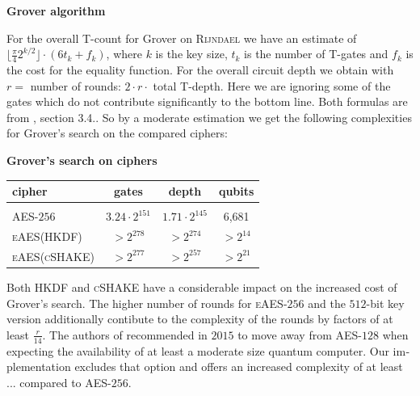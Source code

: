 \documentclass[a4paper,11pt]{article}
\begin{document}
\begin{otherlanguage}{english}
\begin{multicols}{2}
\begin{center}
\textbf{Grover algorithm} \\
\end{center}

\noindent
For the overall T-count for Grover on \textsc{Rijndael} we have an estimate of $\lfloor \frac{\pi}{4} 2^{k/2}\rfloor \cdot (6 t_{k} + f_k)$, where $k$ is the key size, $t_k$ is the number of T-gates and $f_k$ is the cost for the equality function. For the overall circuit depth we obtain with $r=$ number of rounds: $2 \cdot r \cdot$ total T-depth. Here we are ignoring some of the gates which do not contribute significantly to the bottom line. Both formulas are from \cite{GRO}, section 3.4.. So by a moderate estimation we get the following complexities for Grover's search on the compared ciphers:\\ 

\begin{center}
\textbf{Grover's search on ciphers} \\
\vspace{0.2cm}
  \begin{tabular}{l|c|c|c}
  cipher &  gates & depth & qubits \\ 
  \hline
    &  &  & \\ [-8pt]
  \textsc{AES}-$256$ & $3.24 \cdot 2^{151}$  & $1.71 \cdot 2^{145}$  & 6,681 \\
  \small{\textsc{eAES}(\tiny{\textsc{HKDF}})} & $> 2^{278}$ & $ > 2^{274}$ & $>  2^{14}$  \\  
  \small{\textsc{eAES}(\tiny{\textsc{cSHAKE}})} & $> 2^{277}$ & $ > 2^{257}$ & $> 2^{21}$  \\  
  \end{tabular} 
\end{center}
\vspace{0.5cm} 


\noindent
Both \textsc{HKDF} and \textsc{cSHAKE} have a considerable impact on the increased cost of Grover's search. The higher number of rounds for \textsc{eAES}-$256$ and the $512$-bit key version additionally contibute to the complexity of the rounds by factors of at least $\frac{r}{14}$. The authors of \cite{GRO} recommended in $2015$ to move away from \textsc{AES}-$128$ when expecting the availability of at least a moderate size quantum computer. Our implementation excludes that option and offers an increased complexity of at least ... compared to \textsc{AES}-$256$. \\

\vspace{0.1cm}


\end{multicols}
\end{otherlanguage}
\end{document}
